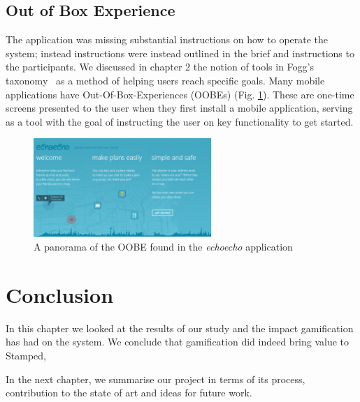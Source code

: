 \subsection{Out of Box Experience}
The application was missing substantial instructions on how to operate the system; instead instructions were instead outlined in the brief and instructions to the participants. We discussed in chapter 2 the notion of tools in Fogg's taxonomy~\cite{fogg1998persuasive} as a method of helping users reach specific goals. Many mobile applications have Out-Of-Box-Experiences (OOBEs) (Fig. \ref{fig:OOBE}). These are one-time screens presented to the user when they first install a mobile application,  serving as a tool with the goal of instructing the user on key functionality to get started.
\begin{figure}[H]
 \centering
  \includegraphics[width=0.6\textwidth]{img/OOBE.png}
     \caption{A panorama of the OOBE found in the \emph{echoecho} application}
     \label{fig:OOBE}
\end{figure}
\section{Conclusion}
In this chapter we looked at the results of our study and the impact gamification has had on the system. We conclude that gamification did indeed bring value to Stamped,

In the next chapter, we summarise our project in terms of its process, contribution to the state of art and ideas for future work.
